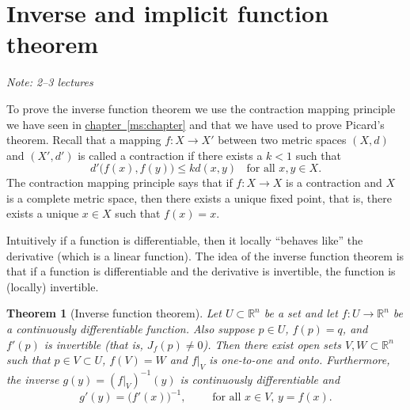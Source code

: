 \documentclass[12pt]{book}
\newcommand{\R}{{\mathbb{R}}}
\newcommand{\sectionnotes}[1]{\noindent \emph{Note: #1} \medskip \par}
\newcommand{\sectionnewpage}{\clearpage}
\theoremstyle{plain}
\newtheorem{thm}{Theorem}[section]
\theoremstyle{remark}
\theoremstyle{definition}
\theoremstyle{exercise}
\theoremstyle{example}
\newcommand{\chapterref}[1]{\hyperref[#1]{chapter~\ref*{#1}}}
\begin{document}


\sectionnewpage
\section{Inverse and implicit function theorem}
\label{sec:svinvfuncthm}

\sectionnotes{2--3 lectures}

To prove the inverse function theorem we use the contraction mapping
principle we have seen in \chapterref{ms:chapter} and that we have used
to prove Picard's theorem.
Recall that a mapping $f \colon X \to X'$ between two metric
spaces $(X,d)$ and $(X',d')$ is called a contraction 
if there exists a $k < 1$ such that
\begin{equation*}
d'\bigl(f(x),f(y)\bigr) \leq k d(x,y)
\ \ \ \ \text{for all } x,y \in X.
\end{equation*}
The contraction mapping principle says that if $f \colon X \to X$
is a contraction and $X$ is a complete metric space,
then there exists a unique fixed point, that is,
there exists a unique $x \in X$ such that $f(x) = x$.

Intuitively if a function is differentiable, then it
locally ``behaves like'' the derivative (which is a linear function).
The idea of the inverse function theorem is that if a function is
differentiable and the derivative is invertible, the function is
(locally) invertible.


\begin{thm}[Inverse function theorem]
\label{thm:inverse}
Let $U \subset \R^n$ be a set and let
$f \colon U \to \R^n$ be a continuously differentiable function.
Also suppose $p \in U$, $f(p) = q$, and $f'(p)$ is invertible
(that is, $J_f(p) \not=0$).
Then there exist open sets $V, W \subset \R^n$ such that
$p \in V \subset U$, $f(V) = W$ and $f|_V$ is one-to-one and onto.  
Furthermore, the inverse $g(y) = (f|_V)^{-1}(y)$ is continuously differentiable
and 
\begin{equation*}
g'(y) = {\bigl(f'(x)\bigr)}^{-1}, \qquad \text{ for all $x \in V$, $y = f(x)$.}
\end{equation*}
\end{thm}
\end{document}
